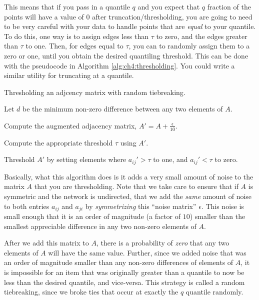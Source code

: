 This means that if you pass in a quantile $q$ and you expect that $q$ fraction of the points will have a value of $0$ after truncation/thresholding, you are going to need to be very careful with your data to handle points that are \emph{equal} to your quantile. To do this, one way is to assign edges less than $\tau$ to zero, and the edges greater than $\tau$ to one. Then, for edges equal to $\tau$, you can to randomly assign them to a zero or one, until you obtain the desired quantiling threshold. This can be done with the pseudocode in Algorithm \ref{alg:ch4:thresholding}. You could write a similar utility for truncating at a quantile.

\begin{algorithm}[h]
    \SetAlgoLined
    \caption{Thresholding an adjcency matrix with random tiebreaking.}
    \label{alg:ch4:thresholding}
    Let $d$ be the minimum non-zero difference between any two elements of $A$.
    


    Compute the augmented adjacency matrix, $A' = A + \frac{\epsilon}{10}$.

    Compute the appropriate threshold $\tau$ using $A'$.

    Threshold $A'$ by setting elements where $a_{ij}' > \tau$ to one, and $a_{ij}' < \tau$ to zero.
\end{algorithm}

Basically, what this algorithm does is it adds a very small amount of noise to the matrix $A$ that you are thresholding. Note that we take care to ensure that if $A$ is symmetric and the network is undirected, that we add the \emph{same} amount of noise to both entries $a_{ij}$ and $a_{ji}$ by \emph{symmetrizing} this ``noise matrix'' $\epsilon$. This noise is small enough that it is an order of magnitude (a factor of $10$) smaller than the smallest appreciable difference in any two non-zero elements of $A$. 

After we add this matrix to $A$, there is a probability of \emph{zero} that any two elements of $A$ will have the same value. Further, since we added noise that was an order of magnitude smaller than any non-zero differences of elements of $A$, it is impossible for an item that was originally greater than a quantile to now be less than the desired quantile, and vice-versa. This strategy is called a random tiebreaking, since we broke ties that occur at exactly the $q$ quantile randomly.

